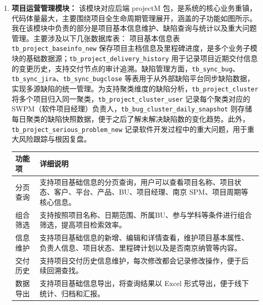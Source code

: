 \begin{enumerate}[label=(\arabic*)]
	
	\item \textbf{项目运营管理模块：}
	该模块对应后端 projectM 包，是系统的核心业务重镇，代码体量最大，主要围绕项目全生命周期管理展开，涵盖的子功能如图所示。我在该模块中负责的部分是项目基本信息维护、缺陷查询与统计以及重大问题管理。主要涉及以下几张数据库表：
	项目基本信息表 \verb|tb_project_baseinfo_new| 保存项目主档信息及里程碑进度，是多个业务子模块的基础数据源；\verb|tb_project_delivery_history| 用于记录项目近期交付信息的变更历史，支持交付节点的审计追溯。缺陷管理方面，\verb|tb_sync_bug|、\verb|tb_sync_jira|、\verb|tb_sync_bugclose| 等表用于从外部缺陷平台同步缺陷数据，实现多源缺陷的统一管理。为支持聚类维度的缺陷分析，\verb|tb_project_cluster| 将多个项目归入同一聚类，\verb|tb_project_cluster_user| 记录每个聚类对应的 SWPM（软件项目经理）负责人，\verb|tb_bug_cluster_daily_snapshot| 则存储每日聚类的缺陷快照数据，便于之后了解未解决缺陷数的变化趋势。此外，\verb|tb_project_serious_problem_new| 记录软件开发过程中的重大问题，用于重大风险跟踪与根因复盘。
	\begin{center}
		\label{tab:proj_baseinfo}
		{\songti{}\selectfont\fontsize{10.5pt}{12.6pt}\selectfont
			\begin{tabular}{p{3.5cm} p{10.5cm}}
				\toprule
				\textbf{功能项} & \textbf{详细说明} \\
				\midrule
				分页查询 & 支持项目基础信息的分页查询，用户可以查看项目名称、项目状态、客户、平台、产品、BU、项目经理、南京 SPM、项目周期等核心信息。 \\
				组合筛选 & 支持按照项目名称、日期范围、所属BU、参与学科等条件进行组合筛选，提高项目检索效率。 \\
				信息维护 & 支持项目基础信息的新增、编辑和详情查看，维护项目基本属性、负责人信息、项目状态、里程碑计划以及是否南京纳管等内容。 \\
				交付历史 & 支持项目交付历史信息维护，每次修改都会记录修改操作，便于后续回溯查找。 \\
				数据导出 & 支持项目基础信息导出，将查询结果以 Excel 形式导出，便于线下统计、归档和汇报。 \\
				\bottomrule
			\end{tabular}
		}
	\end{center}
	
	

\end{enumerate}
